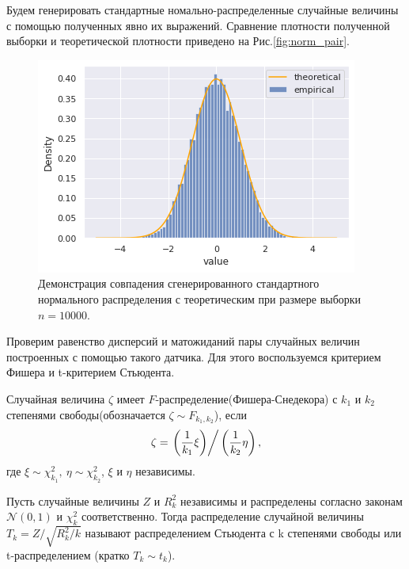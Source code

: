 Будем генерировать стандартные номально-распределенные случайные величины с помощью
 полученных явно их выражений. Сравнение плотности полученной выборки и теоретической
 плотности приведено на Рис.\eqref{fig:norm_pair}.

\begin{figure}[ht]
	\centering
	\includegraphics[width = 0.7\linewidth]{"./resources/norm_pair.png"}
	\caption{Демонстрация совпадения сгенерированного стандартного нормального
	 распределения с теоретическим при размере выборки $ n = 10000 $.}
    \label{fig:norm_pair}
\end{figure}

Проверим равенство дисперсий и матожиданий пары случайных величин построенных с
 помощью такого датчика. Для этого воспользуемся критерием Фишера и t-критерием
 Стьюдента.
\begin{definition}
	Случайная величина $ \zeta $ имеет $ F $-распределение(Фишера-Снедекора) с 
	 $k_1$ и $k_2$
	 степенями свободы(обозначается $ \zeta \sim F_{k_1,k_2}$), если
	$$
	 \zeta = \left. \left( \dfrac{1}{k_1} \xi \right) \right/ \left( \dfrac{1}{k_2}
	  \eta \right),
	$$
	где $ \xi \sim \chi_{k_1}^2, \ \eta \sim \chi_{k_2}^2 $, $ \xi $ и $ \eta $
	 независимы.
\end{definition}

\begin{definition}
	Пусть случайные величины $ Z $ и $ R_k^2 $ независимы и распределены согласно
	 законам $ \mathcal{N}(0,1) $ и $ \chi_k^2 $ соответственно. Тогда распределение
	 случайной величины $ T_k  = Z / \sqrt{R_k^2 / k} $ называют
	 распределением Стьюдента с k степенями свободы или t-распределением
	 (кратко $ T_k \sim t_k $).
\end{definition}

